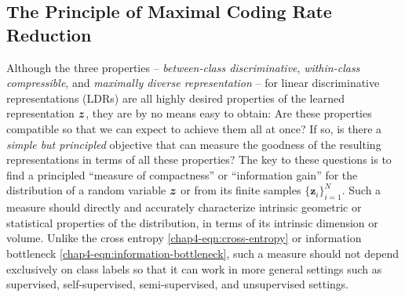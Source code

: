 \documentclass[../../book-main.tex]{subfiles}
\begin{document}
\subsection{The Principle of Maximal Coding Rate Reduction}\label{subsec:MCR2}





Although the three properties -- {\em between-class discriminative}, {\em within-class compressible}, and {\em maximally diverse representation} -- for linear discriminative representations (LDRs) are all highly desired properties  of the learned representation $\bm{z}$, they are by no means easy to obtain: Are these properties compatible so that we can expect to achieve them all at once? If so, is there a {\em simple but principled} objective that can measure the goodness of the resulting representations in terms of all these properties? The key to these questions {is to find} a principled ``measure of compactness'' or ``information gain''  for the distribution of a random variable $\bm{z}$ or from its finite samples $\{\bm z_i\}_{i=1}^N$. Such a measure should directly and accurately characterize intrinsic geometric or statistical properties of the distribution, in terms of its intrinsic dimension or {volume}. Unlike the cross entropy \eqref{chap4-eqn:cross-entropy} or information bottleneck \eqref{chap4-eqn:information-bottleneck}, such a measure should not depend exclusively on class labels so that it can work in more general settings such as supervised, self-supervised, semi-supervised, and unsupervised settings.
\end{document}
